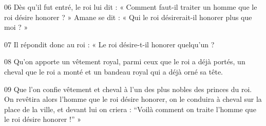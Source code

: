 
06 Dès qu’il fut entré, le roi lui dit : « Comment faut-il traiter un homme que le roi désire honorer ? » Amane se dit : « Qui le roi désirerait-il honorer plus que moi ? »

07 Il répondit donc au roi : « Le roi désire-t-il honorer quelqu’un ?

08 Qu’on apporte un vêtement royal, parmi ceux que le roi a déjà portés, un cheval que le roi a monté et un bandeau royal qui a déjà orné sa tête.

09 Que l’on confie vêtement et cheval à l’un des plus nobles des princes du roi. On revêtira alors l’homme que le roi désire honorer, on le conduira à cheval sur la place de la ville, et devant lui on criera : “Voilà comment on traite l’homme que le roi désire honorer !” »
